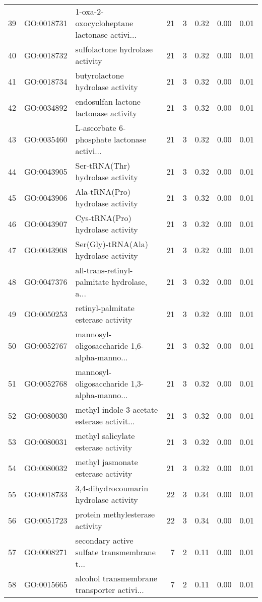 \begin{table}[ht]
\begin{tabular}{rllrrrrr}
  39 & GO:0018731 & 1-oxa-2-oxocycloheptane lactonase activi... &  21 &   3 & 0.32 & 0.00 & 0.01 \\ 
  40 & GO:0018732 & sulfolactone hydrolase activity &  21 &   3 & 0.32 & 0.00 & 0.01 \\ 
  41 & GO:0018734 & butyrolactone hydrolase activity &  21 &   3 & 0.32 & 0.00 & 0.01 \\ 
  42 & GO:0034892 & endosulfan lactone lactonase activity &  21 &   3 & 0.32 & 0.00 & 0.01 \\ 
  43 & GO:0035460 & L-ascorbate 6-phosphate lactonase activi... &  21 &   3 & 0.32 & 0.00 & 0.01 \\ 
  44 & GO:0043905 & Ser-tRNA(Thr) hydrolase activity &  21 &   3 & 0.32 & 0.00 & 0.01 \\ 
  45 & GO:0043906 & Ala-tRNA(Pro) hydrolase activity &  21 &   3 & 0.32 & 0.00 & 0.01 \\ 
  46 & GO:0043907 & Cys-tRNA(Pro) hydrolase activity &  21 &   3 & 0.32 & 0.00 & 0.01 \\ 
  47 & GO:0043908 & Ser(Gly)-tRNA(Ala) hydrolase activity &  21 &   3 & 0.32 & 0.00 & 0.01 \\ 
  48 & GO:0047376 & all-trans-retinyl-palmitate hydrolase, a... &  21 &   3 & 0.32 & 0.00 & 0.01 \\ 
  49 & GO:0050253 & retinyl-palmitate esterase activity &  21 &   3 & 0.32 & 0.00 & 0.01 \\ 
  50 & GO:0052767 & mannosyl-oligosaccharide 1,6-alpha-manno... &  21 &   3 & 0.32 & 0.00 & 0.01 \\ 
  51 & GO:0052768 & mannosyl-oligosaccharide 1,3-alpha-manno... &  21 &   3 & 0.32 & 0.00 & 0.01 \\ 
  52 & GO:0080030 & methyl indole-3-acetate esterase activit... &  21 &   3 & 0.32 & 0.00 & 0.01 \\ 
  53 & GO:0080031 & methyl salicylate esterase activity &  21 &   3 & 0.32 & 0.00 & 0.01 \\ 
  54 & GO:0080032 & methyl jasmonate esterase activity &  21 &   3 & 0.32 & 0.00 & 0.01 \\ 
  55 & GO:0018733 & 3,4-dihydrocoumarin hydrolase activity &  22 &   3 & 0.34 & 0.00 & 0.01 \\ 
  56 & GO:0051723 & protein methylesterase activity &  22 &   3 & 0.34 & 0.00 & 0.01 \\ 
  57 & GO:0008271 & secondary active sulfate transmembrane t... &   7 &   2 & 0.11 & 0.00 & 0.01 \\ 
  58 & GO:0015665 & alcohol transmembrane transporter activi... &   7 &   2 & 0.11 & 0.00 & 0.01 \\ 

\end{tabular}
\end{table}
